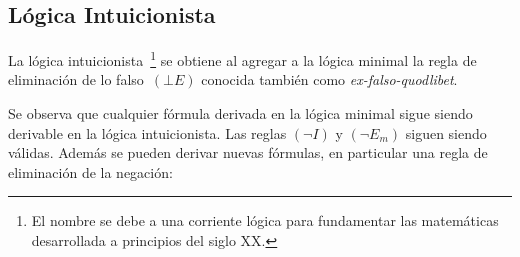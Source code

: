 \documentclass[11pt,letterpaper]{article}
\begin{document}

\subsection{Lógica Intuicionista}

La lógica intuicionista~\footnote{El nombre se debe a una corriente lógica
para fundamentar las matemáticas desarrollada a principios del siglo
XX.}  se obtiene al agregar a la lógica minimal la regla de eliminación de lo 
falso~$(\bot E)$ conocida también como \textit{ex-falso-quodlibet}.
\begin{mathpar}
\end{mathpar}



Se observa que cualquier fórmula derivada en la lógica minimal sigue
siendo derivable en la lógica intuicionista. Las reglas $(\neg I)$ y $(\neg
E_m)$ siguen siendo válidas. Además se pueden derivar
nuevas fórmulas, en particular una regla de eliminación de la negación:
\begin{mathpar}
\end{mathpar}
                                
\end{document}
